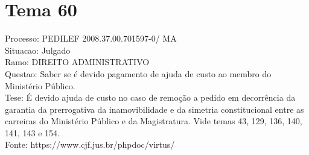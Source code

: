 \documentclass[12pt]{article}
\begin{document}
\section*{Tema 60}
Processo: PEDILEF 2008.37.00.701597-0/ MA\\
Situacao: Julgado\\
Ramo: DIREITO ADMINISTRATIVO\\
Questao: Saber se é devido pagamento de ajuda de custo ao membro do Ministério Público.\\
Tese: É devido ajuda de custo no caso de remoção a pedido em decorrência da garantia da prerrogativa da inamovibilidade e da simetria constitucional entre as carreiras do Ministério Público e da Magistratura. Vide temas 43, 129, 136, 140, 141, 143 e 154.\\
Fonte: https://www.cjf.jus.br/phpdoc/virtus/
\end{document}
